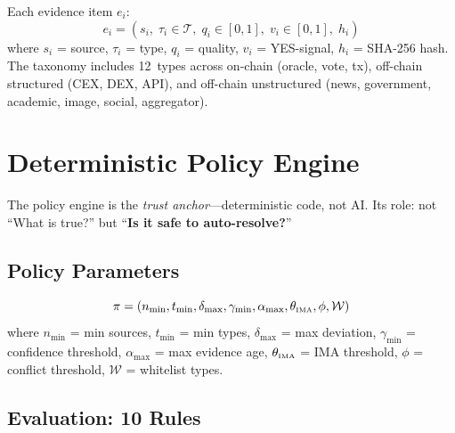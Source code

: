 \documentclass[11pt,a4paper,twocolumn]{article}
\begin{document}
Each evidence item $e_i$:
\begin{equation}
    e_i = (s_i,\; \tau_i \!\in\! \mathcal{T},\; q_i \!\in\! [0,1],\; v_i \!\in\! [0,1],\; h_i)
    \label{eq:evidence}
\end{equation}
where $s_i$ = source, $\tau_i$ = type, $q_i$ = quality, $v_i$ = YES-signal, $h_i$ = SHA-256 hash. The taxonomy includes 12~types across on-chain (oracle, vote, tx), off-chain structured (CEX, DEX, API), and off-chain unstructured (news, government, academic, image, social, aggregator).

\section{Deterministic Policy Engine}

The policy engine is the \emph{trust anchor}---deterministic code, not AI. Its role: not ``What is true?'' but ``\textbf{Is it safe to auto-resolve?}''

\subsection{Policy Parameters}

\begin{equation}
    \pi = (n_{\min}, t_{\min}, \delta_{\max}, \gamma_{\min}, \alpha_{\max}, \theta_{\text{\tiny IMA}}, \phi, \mathcal{W})
    \label{eq:policy}
\end{equation}
where $n_{\min}$ = min sources, $t_{\min}$ = min types, $\delta_{\max}$ = max deviation, $\gamma_{\min}$ = confidence threshold, $\alpha_{\max}$ = max evidence age, $\theta_{\text{\tiny IMA}}$ = IMA threshold, $\phi$ = conflict threshold, $\mathcal{W}$ = whitelist types.

\subsection{Evaluation: 10 Rules}
\end{document}
